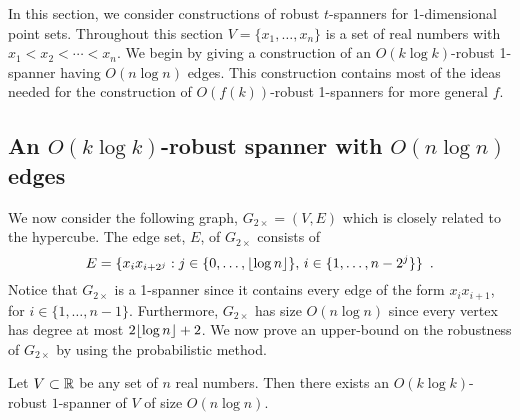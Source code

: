 \documentclass{patmorin}
\begin{document}
In this section, we consider constructions of robust $t$-spanners for
1-dimensional point sets.  Throughout this section $V=\{x_1,\ldots,x_n\}$
is a set of real numbers with $x_1<x_2<\cdots<x_n$.  We begin by giving
a construction of an $O(k\log k)$-robust 1-spanner having $O(n\log n)$
edges.  This construction contains most of the ideas needed for the
construction of $O(f(k))$-robust 1-spanners for more general $f$.

\subsection{An $O(k\log k)$-robust spanner with $O(n\log n)$ edges}

We now consider the following graph, $G_{2\times}=(V,E)$ which is
closely related to the hypercube.   The edge set, $E$, of $G_{2\times}$
consists of
\[
  E = \{x_ix_{i+2^j} : j\in\{0,\ldots,{\lfloor \log n \rfloor}\},\, 
        i\in\{1,\ldots,n-2^j\} \} \enspace .
\] 
Notice that $G_{2\times}$ is a 1-spanner since it contains every
edge of the form $x_ix_{i+1}$, for $i\in\{1,\ldots,n-1\}$. Furthermore,
$G_{2\times}$ has size $O(n\log n)$ since every vertex has degree at most
$2{\lfloor \log n \rfloor}+2$.  We now prove an upper-bound on the robustness of
$G_{2\times}$ by using the probabilistic method.

\begin{thm}
  Let $V\subset \mathbb{R}$ be any set of $n$ real numbers.  Then there exists
  an $O(k\log k)$-robust $1$-spanner of $V$ of size $O(n\log n)$.
\end{thm}
\end{document}
